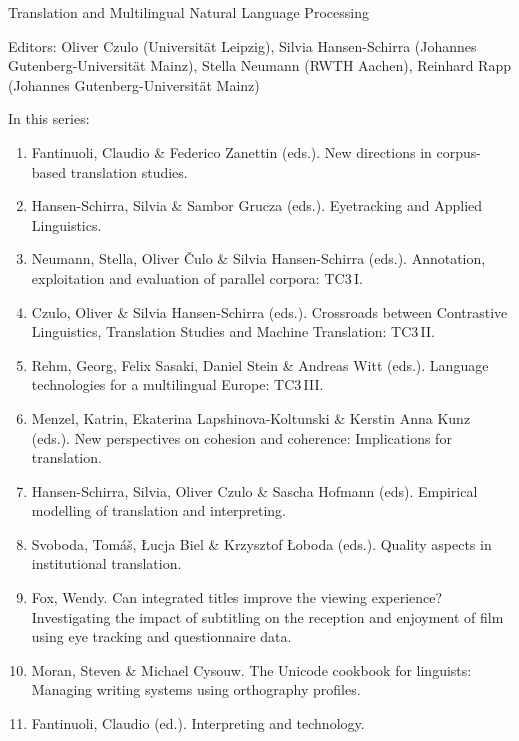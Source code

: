 {\large Translation and Multilingual Natural Language Processing}

\bigskip

Editors: Oliver Czulo (Universität Leipzig),
Silvia Hansen-Schirra (Johannes Gutenberg-Universität Mainz),
Stella Neumann (RWTH Aachen),
Reinhard Rapp (Johannes Gutenberg-Universität Mainz)

\bigskip

In this series:

\begin{enumerate}
\item Fantinuoli, Claudio \& Federico Zanettin (eds.). New directions in corpus-based translation studies.
\item Hansen-Schirra, Silvia \& Sambor Grucza (eds.). Eyetracking and Applied Linguistics.
\item Neumann, Stella, Oliver Čulo \& Silvia Hansen-Schirra (eds.). Annotation, exploitation and evaluation of parallel corpora: TC3\,I.
\item Czulo, Oliver  \& Silvia Hansen-Schirra (eds.). Crossroads between Contrastive Linguistics, Translation Studies and Machine Translation: TC3\,II.
\item Rehm, Georg, Felix Sasaki, Daniel Stein \& Andreas Witt (eds.). Language technologies for a multilingual Europe: TC3\,III.
\item Menzel, Katrin, Ekaterina Lapshinova-Koltunski \& Kerstin Anna Kunz  (eds.). New perspectives on cohesion and coherence: Implications for translation.
\item Hansen-Schirra, Silvia, Oliver Czulo \& Sascha Hofmann (eds). Empirical modelling of translation and interpreting.
\item Svoboda, Tomáš, Łucja Biel \& Krzysztof Łoboda (eds.). Quality aspects in institutional translation.
\item Fox, Wendy. Can integrated titles improve the viewing experience? Investigating the impact of subtitling on the reception and enjoyment of film using eye tracking and questionnaire data.
\item Moran, Steven \& Michael Cysouw. The Unicode cookbook for linguists: Managing writing systems using orthography profiles.
\item Fantinuoli, Claudio (ed.). Interpreting and technology.
\end{enumerate}
